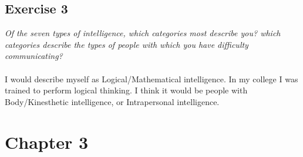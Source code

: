 \documentclass[a4paper,11pt]{article}
\begin{document}
\subsection*{Exercise 3}
\emph{\indent Of the seven types of intelligence, which categories most describe you? which categories describe the types of people with which you have difficulty communicating?}\\
\\
 I would describe myself as Logical/Mathematical intelligence. In my college I was trained to perform logical thinking. I think it would be people with Body/Kinesthetic intelligence, or Intrapersonal intelligence.


 \section*{Chapter 3}
\end{document}
